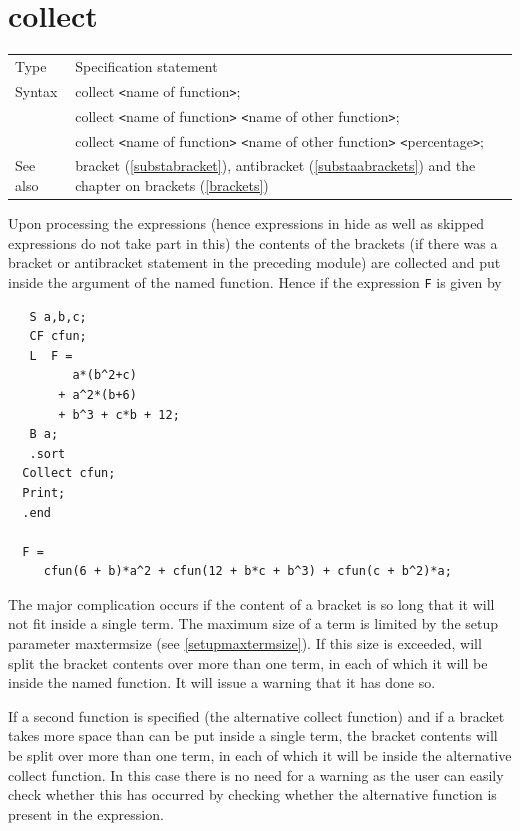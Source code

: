 
\section{collect}
\label{substacollect}

\noindent \begin{tabular}{ll}
Type & Specification statement\\
Syntax & collect {\tt<}name of function{\tt>}; \\
       & collect {\tt<}name of function{\tt>} 
        {\tt<}name of other function{\tt>}; \\
       & collect {\tt<}name of function{\tt>} 
        {\tt<}name of other function{\tt>} {\tt<}percentage{\tt>};
\\ See also & bracket (\ref{substabracket}), antibracket 
     (\ref{substaabrackets}) and the chapter on brackets 
     (\ref{brackets})
\end{tabular} \vspace{4mm}

\noindent Upon processing the expressions (hence expressions 
in hide as well as skipped expressions do not take part in this) the 
contents of the brackets (if there was a bracket or 
antibracket statement in the preceding module) are 
collected and put inside the argument of the named function. Hence if the 
expression \verb:F: is given by
\begin{verbatim}
   S a,b,c;
   CF cfun;
   L  F =
         a*(b^2+c)
       + a^2*(b+6)
       + b^3 + c*b + 12;
   B a;
   .sort
  Collect cfun;
  Print;
  .end

  F =
     cfun(6 + b)*a^2 + cfun(12 + b*c + b^3) + cfun(c + b^2)*a;
\end{verbatim}
The major complication occurs if the content of a 
bracket is so long that it will not fit inside a single term. The maximum 
size of a term is limited by the setup parameter 
maxtermsize (see \ref{setupmaxtermsize}). If this size 
is exceeded, {\FORM} will split the bracket contents over more than one term, 
in each of which it will be inside the named function. It will issue a 
warning that it has done so. \vspace{4mm}

\noindent If a second function is specified (the 
alternative collect function) and if a bracket takes 
more space than can be put inside a single term, the bracket contents will 
be split over more than one term, in each of which it will be inside the 
alternative collect function. In this case there is no need for a 
warning 
as the user can easily check whether this has occurred by checking whether 
the alternative function is present in the expression. \vspace{4mm}

